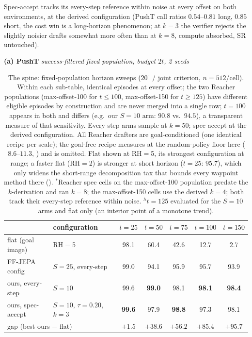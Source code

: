 \documentclass{article}
\newcommand{\ours}[1]{\textbf{#1}}
\newcommand{\degc}[1]{$#1^\circ$}
\begin{document}
Spec-accept tracks its every-step reference within noise at every offset on both
environments, at the derived configuration (PushT call ratios $0.54$--$0.81$ long,
$0.85$ short, the cost win is a long-horizon phenomenon; at $k{=}3$ the verifier
rejects the slightly noisier drafts somewhat more often than at $k{=}8$, compute
absorbed, SR untouched).

\begin{table}[h]
\centering
\small
\setlength{\tabcolsep}{6pt}
\caption{The spine: fixed-population horizon sweeps (\degc{20} / joint criterion,
$n{=}512$/cell). Within each sub-table, identical episodes at every offset; the two
Reacher populations (max-offset-100 for $t{\le}100$, max-offset-150 for $t{\ge}125$)
have different eligible episodes by construction and are never merged into a single
row; $t{=}100$ appears in both and differs (e.g.\ our $S{=}10$ arm: $90.8$ vs.\
$94.5$), a transparent measure of that sensitivity. Every-step arms sample at
$k{=}50$; spec-accept at the derived configuration. All Reacher drafters are
goal-conditioned (one identical recipe per scale); the goal-free recipe measures at
the random-policy floor here ($8.6$--$11.3$, \Cref{sec:why-regime}) and is omitted.
Flat shown at RH$=$5, its strongest configuration at range; a faster flat (RH$=$2)
is stronger at short horizon ($t{=}25$: $95.7$), which only widens the short-range
decomposition tax that bounds every waypoint method there (\Cref{sec:why-regime}).
$^{\ast}$Reacher spec cells on the max-offset-100 population predate the
$k$-derivation and ran $k{=}8$; the max-offset-150 cells use the derived $k{=}4$;
both track their every-step reference within noise. $^{h}$$t{=}125$ evaluated for the
$S{=}10$ arms and flat only (an interior point of a monotone trend).}
\label{tab:spine}

\vspace{2pt}
\textbf{(a) PushT} \quad \emph{success-filtered fixed population, budget $2t$, 2 seeds}

\vspace{2pt}
\begin{tabular}{llccccc}
\toprule
& configuration & $t{=}25$ & $t{=}50$ & $t{=}75$ & $t{=}100$ & $t{=}150$ \\
\midrule
flat (goal image)   & RH$=$5                          & 98.1 & 60.4 & 42.6 & 12.7 & 2.7 \\
FF-JEPA config      & $S{=}25$, every-step            & 99.0 & 94.1 & 95.9 & 95.7 & 93.9 \\
ours, every-step    & $S{=}10$                        & 99.6 & \ours{99.0} & 98.1 & \ours{98.1} & \ours{98.4} \\
ours, spec-accept   & $S{=}10$, $\tau{=}0.20$, $k{=}3$ & \ours{99.6} & 97.9 & \ours{98.8} & 97.3 & 98.1 \\
\midrule
\multicolumn{2}{l}{gap (best ours $-$ flat)} & $+1.5$ & $+38.6$ & $+56.2$ & $+85.4$ & $+95.7$ \\
\bottomrule
\end{tabular}


\end{table}
\end{document}
